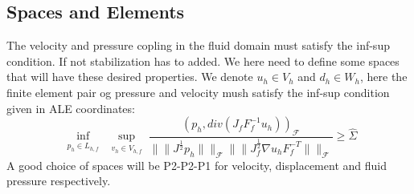 \subsection{Spaces and Elements}
The velocity and pressure copling in the fluid domain must satisfy the inf-sup condition. If not stabilization has to added. We here need to define some spaces that will have these desired properties.
We denote $u_h \in V_h$ and $ d_h \in W_h $, here the finite element pair og pressure and velocity mush satisfy the inf-sup condition given in ALE coordinates:
$$   \inf_{\substack{p_h \in L_{h,f}}}  \sup_{\substack{v_h \in V_{h,f}}} \frac{ (p_h, div(J_f F_f^{-1} u_h))_{\mathcal{F}} }{ \|\|J^{\frac{1}{2}} p_h  \|\|_{\mathcal{F}} \|\|  J^{\frac{1}{2}}_{f} \nabla u_h F_f^{-T} \|\|_{\mathcal{F}}  } \geq \hat{\Sigma}     $$
A good choice of spaces will be P2-P2-P1 for velocity, displacement and fluid pressure respectively. 








